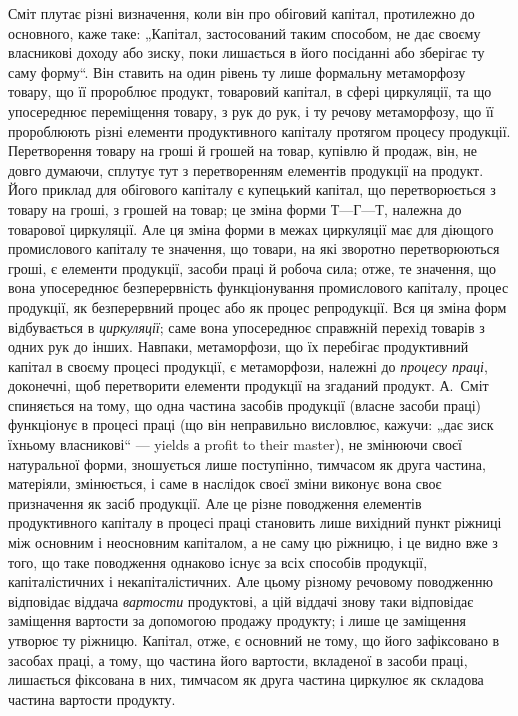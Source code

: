Сміт плутає різні визначення, коли він про обіговий капітал, протилежно
до основного, каже таке: „Капітал, застосований таким способом,
не дає своєму власникові доходу або зиску, поки лишається в його посіданні
або зберігає ту саму форму“. Він ставить на один рівень ту лише
формальну метаморфозу товару, що її пророблює продукт, товаровий
капітал, в сфері циркуляції, та що упосереднює переміщення товару,
з рук до рук, і ту речову метаморфозу, що її пророблюють різні елементи
продуктивного капіталу протягом процесу продукції. Перетворення
товару на гроші й грошей на товар, купівлю й продаж, він, не довго
думаючи, сплутує тут з перетворенням елементів продукції на продукт.
Його приклад для обігового капіталу є купецький капітал, що перетворюється
з товару на гроші, з грошей на товар; це зміна форми $Т — Г — Т$,
належна до товарової циркуляції. Але ця зміна форми в межах циркуляції
має для діющого промислового капіталу те значення, що товари, на
які зворотно перетворюються гроші, є елементи продукції, засоби праці
й робоча сила; отже, те значення, що вона упосереднює безперервність
функціонування промислового капіталу, процес продукції, як безперервний
процес або як процес репродукції. Вся ця зміна форм відбувається
в \emph{циркуляції}; саме вона упосереднює справжній перехід товарів з
одних рук до інших. Навпаки, метаморфози, що їх перебігає продуктивний
капітал в своєму процесі продукції, є метаморфози, належні до
\emph{процесу праці}, доконечні, щоб перетворити елементи продукції на
згаданий продукт. А.~Сміт спиняється на тому, що одна частина засобів
продукції (власне засоби праці) функціонує в процесі праці (що він
неправильно висловлює, кажучи: „дає зиск їхньому власникові“ — yields а
profit to their master), не змінюючи своєї натуральної форми, зношується
лише поступінно, тимчасом як друга частина, матеріяли, змінюється, і
саме в наслідок своєї зміни виконує вона своє призначення як засіб продукції.
Але це різне поводження елементів продуктивного капіталу в
процесі праці становить лише вихідний пункт ріжниці між основним і неосновним
капіталом, а не саму цю ріжницю, і це видно вже з того, що
таке поводження однаково існує за всіх способів продукції, капіталістичних
і некапіталістичних. Але цьому різному речовому поводженню відповідає
віддача \emph{вартости} продуктові, а цій віддачі знову таки відповідає
заміщення вартости за допомогою продажу продукту; і лише це
заміщення утворює ту ріжницю. Капітал, отже, є основний не тому, що
його зафіксовано в засобах праці, а тому, що частина його вартости,
вкладеної в засоби праці, лишається фіксована в них, тимчасом як друга
частина циркулює як складова частина вартости продукту.

